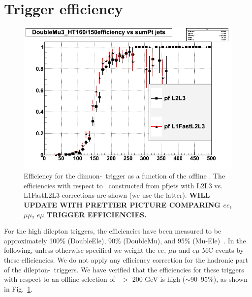 \section{Trigger efficiency}
\label{sec:trgEff}


\begin{figure}[tbh]
\begin{center}
\includegraphics[width=0.6\linewidth]{plots/httrig.png}
\caption{\label{fig:httrig}\protect Efficiency for the dimuon-\Ht\ trigger as a function of the offline \Ht. 
The efficiencies with respect to \Ht\ constructed from pfjets with L2L3 vs. L1FastL2L3 corrections
are shown (we use the latter).
{\bf WILL UPDATE WITH PRETTIER PICTURE COMPARING $ee$, $\mu\mu$, $e\mu$ TRIGGER EFFICIENCIES.}
}
\end{center}
\end{figure}

For the high \pt dilepton triggers, the efficiencies have been measured to be approximately
100\% (DoubleEle), 90\% (DoubleMu), and 95\% (Mu-Ele)~\cite{ref:HWW}. 
In the following, unless otherwise specified we weight the $ee$, $\mu\mu$ and $e\mu$ MC events 
by these efficiencies. We do not apply any efficiency correction for the hadronic 
part of the dilepton-\Ht\ triggers. We have verified that the efficiencies for these triggers
with respect to an offline selection of \Ht\ $>$ 200 GeV is high ($\sim$90--95\%), 
as shown in Fig.~\ref{fig:httrig}.



